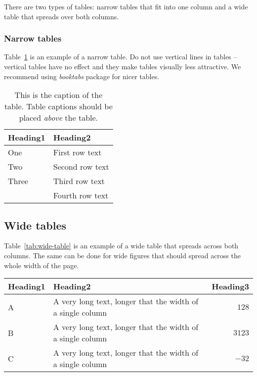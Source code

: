 \documentclass[10pt, a4paper]{article}
\begin{document}
There are two types of tables: narrow tables that fit into one column and a wide table that spreads over both columns.

\subsubsection{Narrow tables}

Table~\ref{tab:narrow-table} is an example of a narrow table. Do not use vertical lines in tables -- vertical tables have no effect and they make tables visually less attractive. We recommend using \textit{booktabs} package for nicer tables.

\begin{table}
\caption{This is the caption of the table. Table captions should be placed \textit{above} the table.}
\label{tab:narrow-table}
\begin{center}
\begin{tabular}{ll}
\toprule
Heading1 & Heading2 \\
\midrule
One & First row text \\
Two   & Second row text \\
Three   & Third row text \\
      & Fourth row text \\
\bottomrule
\end{tabular}
\end{center}
\end{table}

\subsection{Wide tables}

Table~\ref{tab:wide-table} is an example of a wide table that spreads across both columns. The same can be done for wide figures that should spread across the whole width of the page.

\begin{table*}
\caption{Wide-table caption}
\label{tab:wide-table}
\begin{center}
\begin{tabular}{llr}
\toprule
Heading1 & Heading2 & Heading3\\
\midrule
A & A very long text, longer that the width of a single column & $128$\\
B & A very long text, longer that the width of a single column & $3123$\\
C & A very long text, longer that the width of a single column & $-32$\\
\bottomrule
\end{tabular}
\end{center}
\end{table*}
\end{document}
